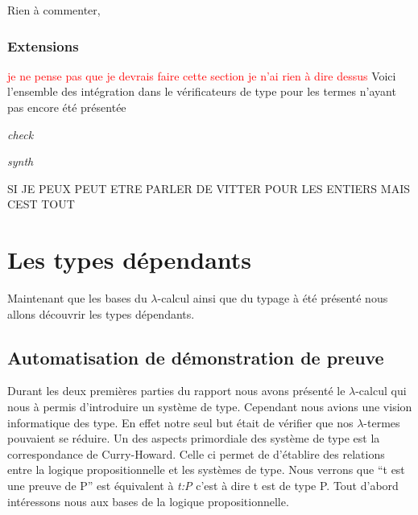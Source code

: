 \documentclass {article}
\newcommand{\codefrom}[3]
           {}
\theoremstyle{definition}
\theoremstyle{remark}
\newcommand{\todo}[1]{\textcolor{red}{#1}}
\begin{document}
Rien à commenter,

\subsubsection{Extensions}
\label{extensions_implem}

\todo{je ne pense pas que je devrais faire cette section je n'ai rien à dire dessus}
Voici l'ensemble des intégration dans le vérificateurs de type pour les termes
n'ayant pas encore été présentée

\emph{check} 
\codefrom{typed}{lambda}{inTm_extensions}
\emph{synth} 
\codefrom{typed}{lambda}{exTm_extensions}

SI JE PEUX PEUT ETRE PARLER DE VITTER POUR LES ENTIERS MAIS CEST TOUT


















\section{Les types dépendants}

Maintenant que les bases du $\lambda$-calcul ainsi que du typage à été présenté 
nous allons découvrir les types dépendants. 
 
\subsection{Automatisation de démonstration de preuve}
Durant les deux premières parties du rapport nous avons présenté le $\lambda$-calcul
qui nous à permis d'introduire un système de type. Cependant nous avions une vision 
informatique des type. En effet notre seul but était de vérifier que nos $\lambda$-termes
pouvaient se réduire. 
Un des aspects primordiale des système de type est la correspondance de Curry-Howard.
Celle ci permet de d'établire des relations entre la logique propositionnelle et les systèmes 
de type. Nous verrons que ``t est une preuve de P'' est équivalent à \emph{t:P} c'est à dire
t est de type P.
Tout d'abord intéressons nous aux bases de la logique propositionnelle.
\end{document}
